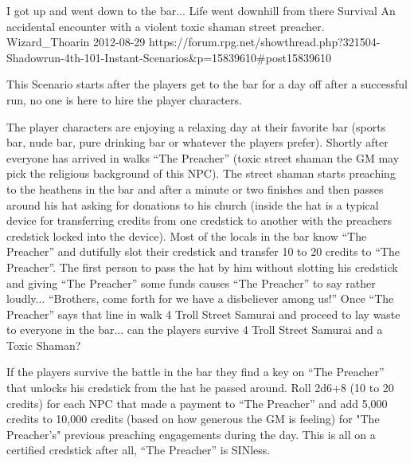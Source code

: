 \begin{scenario}{I got up and went down to the bar... Life went downhill from there}
	{Survival}
	{An accidental encounter with a violent toxic shaman street preacher.}
	{Wizard\_Thoarin}
	{2012-08-29}
	{https://forum.rpg.net/showthread.php?321504-Shadowrun-4th-101-Instant-Scenarios\&p=15839610\#post15839610}

 This Scenario starts after the players get to the bar for a day off after a successful run, no one is here to hire the player characters.

\synopsis  The player characters are enjoying a relaxing day at their favorite bar (sports bar, nude bar, pure drinking bar or whatever the players prefer). Shortly after everyone has arrived in walks ``The Preacher'' (toxic street shaman the GM may pick the religious background of this NPC). The street shaman starts preaching to the heathens in the bar and after a minute or two finishes and then passes around his hat asking for donations to his church (inside the hat is a typical device for transferring credits from one credstick to another with the preachers credstick locked into the device). Most of the locals in the bar know ``The Preacher'' and dutifully slot their credstick and transfer 10 to 20 credits to ``The Preacher''. The first person to pass the hat by him without slotting his credstick and giving ``The Preacher'' some funds causes ``The Preacher'' to say rather loudly... ``Brothers, come forth for we have a disbeliever among us!'' Once ``The Preacher'' says that line in walk 4 Troll Street Samurai and proceed to lay waste to everyone in the bar... can the players survive 4 Troll Street Samurai and a Toxic Shaman?

\notes  If the players survive the battle in the bar they find a key on ``The Preacher'' that unlocks his credstick from the hat he passed around. Roll 2d6+8 (10 to 20 credits) for each NPC that made a payment to ``The Preacher'' and add 5,000 credits to 10,000 credits (based on how generous the GM is feeling) for "The Preacher's" previous preaching engagements during the day. This is all on a certified credstick after all, ``The Preacher'' is SINless. 

\end{scenario}
